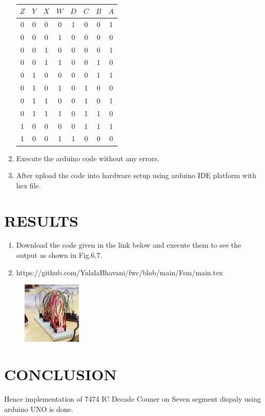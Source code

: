 \documentclass[conference]{IEEEtran}
\begin{document}
\begin{enumerate}
\begin{table}[htbp]
    \centering
\begin{tabular}
{ | c | c | c | c | c | c | c | c | } \hline
$Z$ & $Y$ & $X$ & $W$ & $D$ & $C$ & $B$ & $A$\\\hline
0   & 0   & 0   & 0   & 1  & 0 & 0  & 1 \\
0   & 0   & 0   & 1   & 0  & 0 & 0  & 0 \\
0   & 0   & 1   & 0   & 0  & 0 & 0  & 1 \\
0   & 0   & 1   & 1   & 0  & 0 & 1  & 0 \\
0   & 1   & 0   & 0   & 0  & 0 & 1  & 1 \\  
0   & 1   & 0   & 1   & 0  & 1 & 0  & 0 \\
0   & 1   & 1   & 0   & 0  & 1 & 0  & 1 \\  
0   & 1   & 1   & 1   & 0  & 1 & 1  & 0 \\
1   & 0   & 0   & 0   & 0  & 1 & 1  & 1 \\
1   & 0   & 0   & 1   & 1  & 0 & 0  & 0 \\ \hline
\end{tabular}
\vspace{0.15cm}
\caption{\label{tab:widgets}}
\end{table}
	
\item Execute the arduino code without any errors.
\item After upload the code into hardware setup using arduino IDE platform with hex file.
 \end{enumerate}

\section{RESULTS}
 \begin{enumerate}
	 \item Download the code given in the link below and execute them to see the output as shown in Fig.6,7. 
	 \item https://github.com/YalalaBhavani/fwc/blob/main/Fsm/main.tex
 \end{enumerate}
 \begin{figure}[h] 
	\centering 
	\includegraphics[width=0.25\textwidth]{8.jpg   }
	\caption{\label{fig-6:Gates}}    
\end{figure}




\section{CONCLUSION}
Hence implementation of 7474 IC Decade Couner on Seven segment dispaly using arduino UNO is done.
\end{document}
